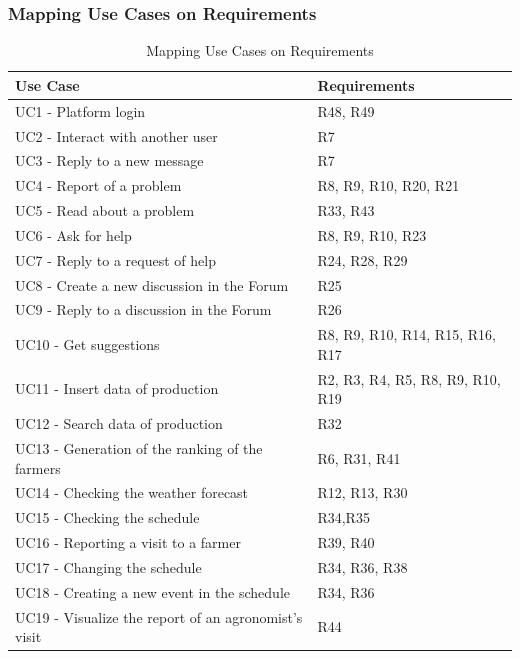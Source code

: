 \subsubsection{Mapping Use Cases on Requirements}
\begin{table}[H]
\centering
    \begin{tabular}{@{}p{0.6\linewidth}p{0.4\linewidth}@{}}
        \hline
        \textbf{Use Case} & \textbf{Requirements}\\
        \hline
        UC1 - Platform login & R48, R49\\
        UC2 - Interact with another user &	R7\\
        UC3 - Reply to a new message	& R7\\
        UC4 - Report of a problem & R8, R9, R10, R20, R21\\
        UC5 - Read about a problem & R33, R43\\
        UC6 - Ask for help & R8, R9, R10, R23\\
        UC7 - Reply to a request of help	& R24, R28, R29\\
        UC8 - Create a new discussion in the Forum & R25\\
        UC9 - Reply to a discussion in the Forum	& R26\\
        UC10 - Get suggestions & R8, R9, R10, R14, R15, R16, R17\\
        UC11 - Insert data of production	& R2, R3, R4, R5, R8, R9, R10, R19\\
        UC12 - Search data of production	& R32\\
        UC13 - Generation of the ranking of the farmers & R6, R31, R41\\
        UC14 - Checking the weather forecast	& R12, R13, R30\\
        UC15 - Checking the schedule	& R34,R35\\
        UC16 - Reporting a visit to a farmer	& R39, R40\\
        UC17 - Changing the schedule	& R34, R36, R38\\
        UC18 - Creating a new event in the schedule & R34, R36\\
        UC19 - Visualize the report of an agronomist’s visit	& R44\\
        \hline
    \end{tabular}
    \caption{Mapping Use Cases on Requirements}
\end{table}

